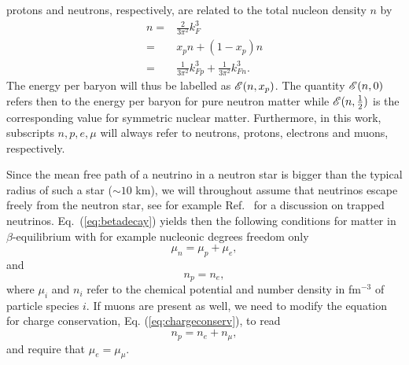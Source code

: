 protons and neutrons, respectively, are related to the total nucleon density $n$ by
\begin{align}
     n = & \frac{2}{3\pi^2} k_F^3 \nonumber \\ = & x_p n + (1-x_p) n
     \nonumber \\ = & \frac{1}{3\pi^2} k_{Fp}^3 + \frac{1}{3\pi^2}
     k_{Fn}^3.
    \label{eq:densi}
\end{align}
The energy per baryon will thus be labelled as ${\cal E}(n,x_p)$. The
quantity ${\cal E}(n,0)$ refers then to the energy per baryon for pure
neutron matter while ${\cal E}(n,\frac{1}{2})$ is the
corresponding value for symmetric nuclear matter. Furthermore, in this work, subscripts
$n,p,e,\mu$ will always refer to neutrons, protons, electrons and
muons, respectively.


Since the mean free path of a neutrino in a neutron star is bigger
than the typical radius of such a star ($\sim 10$ km), we will
throughout assume that neutrinos escape freely from the neutron star,
see for example Ref.~\cite{prakash2006} for a discussion on trapped
neutrinos. Eq.~(\ref{eq:betadecay}) yields then the following
conditions for matter in $\beta$-equilibrium with for example
nucleonic degrees freedom only
\begin{equation}
    \mu_n=\mu_p+\mu_e,
     \label{eq:npebetaequilibrium}
\end{equation}
and
\begin{equation}
     n_p = n_e,
     \label{eq:chargeconserv}
\end{equation}
where $\mu_i$ and $n_i$ refer to the chemical potential and number
density in fm$^{-3}$ of particle species $i$.  If muons are present as
well, we need to modify the equation for charge conservation,
Eq. (\ref{eq:chargeconserv}), to read
\[
     n_p = n_e+n_{\mu},
\]
and require that $\mu_e = \mu_{\mu}$.

